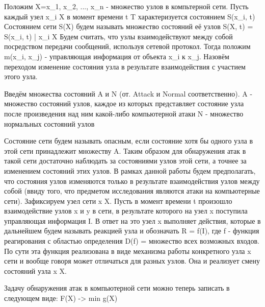 Положим X={x_1, x_2, ..., x_n} - множество узлов в компьтерной сети.
Пусть каждый узел x_i \in X в момент времени t \in T характеризуется состоянием S(x_i, t)
Состоянием сети S(X) будем называть множество состояний её узлов S(X, t) = {S(x_i, t) | x_i \in X}
Будем считать, что узлы взаимодействуют между собой посредством передачи сообщений, используя сетевой протокол. Тогда положим m(x_i, x_j) - управляющая информация от объекта x_i к x_j. Назовём переходом изменение состояния узла в результате взаимодействия с участием этого узла. 

Введём множества состояний A и N (от. Attack и Normal соответственно).
A - множество состояний узлов, каждое из которых представляет состояние узла после произведения над ним какой-либо компьютерной атаки
N - множество нормальных состояний узлов

Состояние сети будем называть опасным, если состояние хотя бы одного узла в этой сети принадлежит множеству A.
Таким образом для обнаружения атак в такой сети достаточно наблюдать за состояниями узлов этой сети, а точнее за изменением состояний этих узлов. 
В рамках данной работы будем предполагать, что состояния узлов изменяются только в результате взаимодействия узлов между собой (ввиду того, что предметом исследования являются атаки на компьютерные сети).
Зафиксируем узел сети x \in X. 
Пусть в момент времени t произошло взаимодействие узлов x и y в сети, в результате которого на узел x поступила управляющая информация I. В ответ на это узел x выполняет действия, которые в дальнейшем будем называть реакцией узла и обозначать R = f(I), где f - функция реагирования с областью определения D(f) = {множество всех возможных входов}. По сути эта функция реализована в виде механизма работы конкретного узла x сети и вообще говоря может отличаться для разных узлов. Она и реализует смену состояний узла x \in X.

Задачу обнаружения атак в компьютерной сети можно теперь записать в следующем виде:
F(X) -> min
g(X) 
